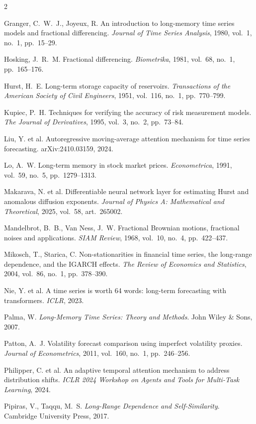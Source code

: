 \documentclass[a4paper,10pt,twoside]{article}
\begin{document}
\begin{multicols}{2}
{\item Granger, C.~W.~J., Joyeux, R. An introduction to long-memory time series models and fractional differencing. \textit{Journal of Time Series Analysis}, 1980, vol.~1, no.~1, pp.~15--29.
\item Hosking, J.~R.~M. Fractional differencing. \textit{Biometrika}, 1981, vol.~68, no.~1, pp.~165--176.
\item Hurst, H.~E. Long-term storage capacity of reservoirs. \textit{Transactions of the American Society of Civil Engineers}, 1951, vol.~116, no.~1, pp.~770--799.
\item Kupiec, P.~H. Techniques for verifying the accuracy of risk measurement models. \textit{The Journal of Derivatives}, 1995, vol.~3, no.~2, pp.~73--84.
\item Liu, Y. et al. Autoregressive moving-average attention mechanism for time series forecasting. arXiv:2410.03159, 2024.
\item Lo, A.~W. Long-term memory in stock market prices. \textit{Econometrica}, 1991, vol.~59, no.~5, pp.~1279--1313.
\item Makarava, N. et al. Differentiable neural network layer for estimating Hurst and anomalous diffusion exponents. \textit{Journal of Physics A: Mathematical and Theoretical}, 2025, vol.~58, art.~265002.
\item Mandelbrot, B.~B., Van Ness, J.~W. Fractional Brownian motions, fractional noises and applications. \textit{SIAM Review}, 1968, vol.~10, no.~4, pp.~422--437.
\item Mikosch, T., Starica, C. Non-stationarities in financial time series, the long-range dependence, and the IGARCH effects. \textit{The Review of Economics and Statistics}, 2004, vol.~86, no.~1, pp.~378--390.
\item Nie, Y. et al. A time series is worth 64 words: long-term forecasting with transformers. \textit{ICLR}, 2023.
\item Palma, W. \textit{Long-Memory Time Series: Theory and Methods}. John Wiley \& Sons, 2007.
\item Patton, A.~J. Volatility forecast comparison using imperfect volatility proxies. \textit{Journal of Econometrics}, 2011, vol.~160, no.~1, pp.~246--256.
\item Philipper, C. et al. An adaptive temporal attention mechanism to address distribution shifts. \textit{ICLR 2024 Workshop on Agents and Tools for Multi-Task Learning}, 2024.
\item Pipiras, V., Taqqu, M.~S. \textit{Long-Range Dependence and Self-Similarity}. Cambridge University Press, 2017.
}
\end{multicols}
\end{document}
